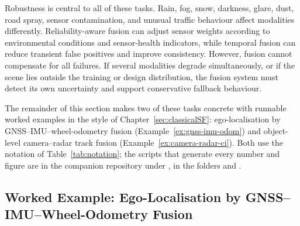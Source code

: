 Robustness is central to all of these tasks. Rain, fog, snow, darkness, glare, dust, road spray, sensor contamination, and unusual traffic behaviour affect modalities differently. Reliability-aware fusion can adjust sensor weights according to environmental conditions and sensor-health indicators, while temporal fusion can reduce transient false positives and improve consistency. However, fusion cannot compensate for all failures. If several modalities degrade simultaneously, or if the scene lies outside the training or design distribution, the fusion system must detect its own uncertainty and support conservative fallback behaviour.

The remainder of this section makes two of these tasks concrete with runnable worked examples in the style of Chapter~\ref{sec:classicalSF}: ego-localisation by GNSS--IMU--wheel-odometry fusion (Example~\ref{ex:gnss-imu-odom}) and object-level camera--radar track fusion (Example~\ref{ex:camera-radar-ci}). Both use the notation of Table~\ref{tab:notation}; the scripts that generate every number and figure are in the companion repository under , in the folders  and .

\subsection{Worked Example: Ego-Localisation by GNSS--IMU--Wheel-Odometry Fusion}
\label{subsec:ex-gnss}

